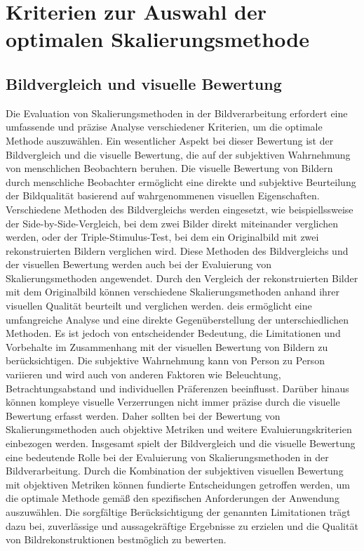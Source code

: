 \section{Kriterien zur Auswahl der optimalen Skalierungsmethode} %

    \subsection{Bildvergleich und visuelle Bewertung}
        
        Die Evaluation von Skalierungsmethoden in der Bildverarbeitung erfordert eine umfassende und präzise Analyse verschiedener Kriterien, um die optimale Methode auszuwählen. 
        Ein wesentlicher Aspekt bei dieser Bewertung ist der Bildvergleich und die visuelle Bewertung, die auf der subjektiven Wahrnehmung von menschlichen Beobachtern beruhen.
        Die visuelle Bewertung von Bildern durch menschliche Beobachter ermöglicht eine direkte und subjektive Beurteilung der Bildqualität basierend auf wahrgenommenen visuellen Eigenschaften. 
        Verschiedene Methoden des Bildvergleichs werden eingesetzt, wie beispiellssweise der Side-by-Side-Vergleich, bei dem zwei Bilder direkt miteinander verglichen werden, oder der Triple-Stimulus-Test, bei dem ein Originalbild mit zwei rekonstruierten Bildern verglichen wird.
        Diese Methoden des Bildvergleichs und der visuellen Bewertung werden auch bei der Evaluierung von Skalierungsmethoden angewendet. 
        Durch den Vergleich der rekonstruierten Bilder mit dem Originalbild können verschiedene Skalierungsmethoden anhand ihrer visuellen Qualität beurteilt und verglichen werden. 
        deis ermöglicht eine umfangreiche Analyse und eine direkte Gegenüberstellung der unterschiedlichen Methoden.
        Es ist jedoch von entscheidender Bedeutung, die Limitationen und Vorbehalte im Zusammenhang mit der visuellen Bewertung von Bildern zu berücksichtigen. 
        Die subjektive Wahrnehmung kann von Person zu Person variieren und wird auch von anderen Faktoren wie Beleuchtung, Betrachtungsabstand und individuellen Präferenzen beeinflusst. 
        Darüber hinaus können kompleye visuelle Verzerrungen nicht immer präzise durch die visuelle Bewertung erfasst werden. 
        Daher sollten bei der Bewertung von Skalierungsmethoden auch objektive Metriken und weitere Evaluierungskriterien einbezogen werden.
        Insgesamt spielt der Bildvergleich und die visuelle Bewertung eine bedeutende Rolle bei der Evaluierung von Skalierungsmethoden in der Bildverarbeitung.
        Durch die Kombination der subjektiven visuellen Bewertung mit objektiven Metriken können fundierte Entscheidungen getroffen werden, um die optimale Methode gemäß den spezifischen Anforderungen der Anwendung auszuwählen. 
        Die sorgfältige Berücksichtigung der genannten Limitationen trägt dazu bei, zuverlässige und aussagekräftige Ergebnisse zu erzielen und die Qualität von Bildrekonstruktionen bestmöglich zu bewerten.
    
